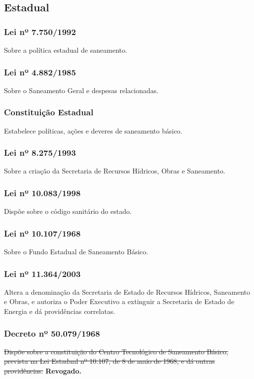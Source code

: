 \subsection{Estadual}
\begin{subapend}
	
	\begin{subsubapend}
		\item \subsubsection{Lei nº 7.750/1992}
		Sobre a política estadual de saneamento.
		\subsubsection{Lei nº 4.882/1985}
		Sobre o Saneamento Geral e despesas relacionadas.
		\subsubsection{Constituição Estadual}
		Estabelece políticas, ações e deveres de saneamento básico.
		\subsubsection{Lei nº 8.275/1993}
		Sobre a criação da Secretaria de Recursos Hídricos, Obras e Saneamento.
		\subsubsection{Lei nº 10.083/1998}
		Dispõe sobre o código sanitário do estado.
		\subsubsection{Lei nº 10.107/1968}
		Sobre o Fundo Estadual de Saneamento Básico.
		\subsubsection{Lei nº 11.364/2003}
		Altera a denominação da Secretaria de Estado de Recursos Hídricos, Saneamento e Obras, e autoriza o Poder Executivo a extinguir a Secretaria de Estado de Energia e dá providências correlatas.
		\subsubsection{Decreto nº 50.079/1968}
		\sout{Dispõe sobre a constituição do Centro Tecnológico de Saneamento Básico, prevista na Lei Estadual nº 10.107, de 8 de maio de 1968, e dá outras providências.} \textbf{Revogado.}

\end{subsubapend}
\end{subapend}
